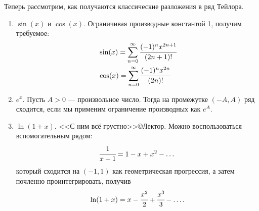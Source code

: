 \documentclass[a4paper, 12pt]{article}
\begin{document}
Теперь рассмотрим, как получаются классические разложения в ряд Тейлора.
\begin{enumerate}
    \item $\sin(x)$ и $\cos(x)$. Ограничивая производные константой 1, получим требуемое:
    \begin{align*}
        &\sin(x) = \sum\limits_{n=0}^{\infty} \cfrac{(-1)^n x^{2n+1}}{(2n+1)!}\\
        &\cos(x) = \sum\limits_{n=0}^{\infty} \cfrac{(-1)^n x^{2n}}{(2n)!}
    \end{align*}
    \item $e^x$. Пусть $A>0$ --- произвольное число. Тогда на промежутке $(-A, A)$ ряд сходится, если мы применим ограничение производных как $e^A$.
    \item $\ln(1+x)$. <<С ним всё грустно>>\copyright Лектор. Можно воспользоваться вспомогательным рядом:
    \[
        \cfrac{1}{x+1} = 1 - x + x^2 - \ldots\\
    \]
    который сходится на $(-1, 1)$ как геометрическая прогрессия, а затем почленно проинтегрировать, получив
    \[
        \ln(1+x) = x - \cfrac{x^2}{2} + \cfrac{x^3}{3} - \ldots.
    \]
\end{enumerate}
\end{document}
